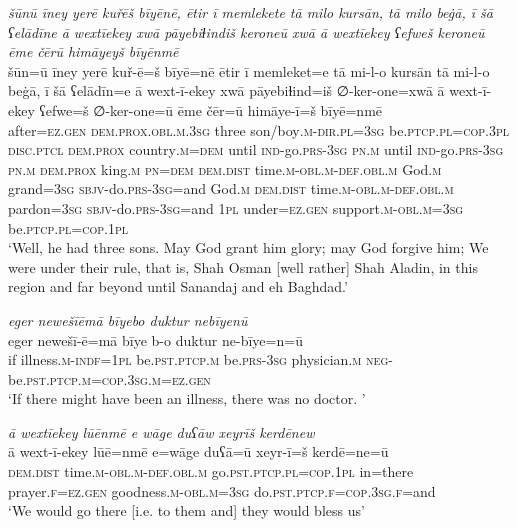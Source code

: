 \ea \label{DG.4}
\textit{šūnū īney yerē kuřēš bīyēnē, ētir ī memlekete tā milo kursān, tā milo beġā, ī šā ʕelādīne ā wextīekey xwā pāyebiɫindiš keroneū xwā ā wextīekey ʕefweš keroneū ēme čērū himāyeyš bīyēnmē} \\ 
\gll šūn=ū īney yerē kuř-ē=š bīyē=nē ētir ī memleket=e tā mi-l-o kursān tā mi-l-o beġā, ī šā ʕelādīn=e ā wext-ī-ekey xwā pāyebiɫind=iš ∅-ker-one=xwā ā wext-ī-ekey ʕefwe=š ∅-ker-one=ū ēme čēr=ū himāye-ī=š bīyē=nmē \\ 
 after\textsc{=ez}\textsc{.gen} \textsc{dem.prox}\textsc{.obl}\textsc{.m}\textsc{.3sg} three son/boy\textsc{.m}\textsc{-dir}\textsc{.pl}\textsc{=3sg} be\textsc{.ptcp}\textsc{.pl}\textsc{=cop}\textsc{.3pl} \textsc{disc.ptcl} \textsc{dem.prox} country\textsc{.m}\textsc{=dem} until \textsc{ind-}go\textsc{.prs}\textsc{-3sg} \textsc{pn}\textsc{.m} until \textsc{ind-}go\textsc{.prs}\textsc{-3sg} \textsc{pn}\textsc{.m} \textsc{dem.prox} king\textsc{.m} \textsc{pn}\textsc{=dem} \textsc{dem.dist} time\textsc{.m}\textsc{-obl}\textsc{.m}\textsc{-def}\textsc{.obl}\textsc{.m} God\textsc{.m} grand\textsc{=3sg} \textsc{sbjv-}do\textsc{.prs}\textsc{-3sg}=and God\textsc{.m} \textsc{dem.dist} time\textsc{.m}\textsc{-obl}\textsc{.m}\textsc{-def}\textsc{.obl}\textsc{.m} pardon\textsc{=3sg} \textsc{sbjv-}do\textsc{.prs}\textsc{-3sg}=and \textsc{1pl} under\textsc{=ez}\textsc{.gen} support\textsc{.m}\textsc{-obl}\textsc{.m}\textsc{=3sg} be\textsc{.ptcp}\textsc{.pl}\textsc{=cop}\textsc{.1pl} \\ 
\glt `Well, he had three sons. May God grant him glory; may God forgive him; We were under their rule, that is, Shah Osman [well rather] Shah Aladin, in this region and far beyond until Sanandaj and eh Baghdad.'
\z 
 
\ea \label{DG.5}
\textit{eger newešīēmā bīyebo duktur nebīyenū} \\ 
\gll eger newešī-ē=mā bīye b-o duktur ne-bīye=n=ū \\ 
 if illness\textsc{.m}\textsc{-indf}\textsc{=1pl} be\textsc{.pst}\textsc{.ptcp}\textsc{.m} be\textsc{.prs}\textsc{-3sg} physician\textsc{.m} \textsc{neg-}be\textsc{.pst}\textsc{.ptcp}\textsc{.m}\textsc{=cop}\textsc{.3sg}\textsc{.m}\textsc{=ez}\textsc{.gen} \\ 
\glt `If there might have been an illness, there was no doctor. '
\z 
 
\ea \label{DG.6}
\textit{ā wextīekey lūēnmē e wāge duʕāw xeyrīš kerdēnew} \\ 
\gll ā wext-ī-ekey lūē=nmē e=wāge duʕā=ū xeyr-ī=š kerdē=ne=ū \\ 
 \textsc{dem.dist} time\textsc{.m}\textsc{-obl}\textsc{.m}\textsc{-def}\textsc{.obl}\textsc{.m} go\textsc{.pst}\textsc{.ptcp}\textsc{.pl}\textsc{=cop}\textsc{.1pl} in=there prayer\textsc{\textsc{.f}}\textsc{=ez}\textsc{.gen} goodness\textsc{.m}\textsc{-obl}\textsc{.m}\textsc{=3sg} do\textsc{.pst}\textsc{.ptcp}\textsc{\textsc{.f}}\textsc{=cop}\textsc{.3sg}\textsc{\textsc{.f}}=and \\ 
\glt `We would go there [i.e. to them and] they would bless us'
\z 
 
